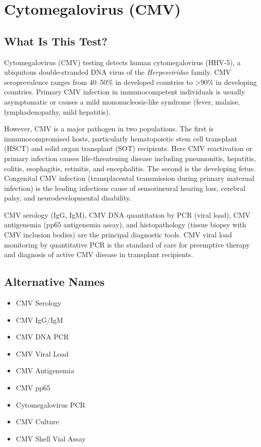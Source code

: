 \chapter{Cytomegalovirus (CMV)}

\section*{What Is This Test?}
Cytomegalovirus (CMV) testing detects human cytomegalovirus (HHV-5), a ubiquitous double-stranded DNA virus of the \textit{Herpesviridae} family. CMV seroprevalence ranges from 40--50\% in developed countries to >90\% in developing countries. Primary CMV infection in immunocompetent individuals is usually asymptomatic or causes a mild mononucleosis-like syndrome (fever, malaise, lymphadenopathy, mild hepatitis).

However, CMV is a major pathogen in two populations. The first is immunocompromised hosts, particularly hematopoietic stem cell transplant (HSCT) and solid organ transplant (SOT) recipients. Here CMV reactivation or primary infection causes life-threatening disease including pneumonitis, hepatitis, colitis, esophagitis, retinitis, and encephalitis. The second is the developing fetus. Congenital CMV infection (transplacental transmission during primary maternal infection) is the leading infectious cause of sensorineural hearing loss, cerebral palsy, and neurodevelopmental disability.

CMV serology (IgG, IgM), CMV DNA quantitation by PCR (viral load), CMV antigenemia (pp65 antigenemia assay), and histopathology (tissue biopsy with CMV inclusion bodies) are the principal diagnostic tools. CMV viral load monitoring by quantitative PCR is the standard of care for preemptive therapy and diagnosis of active CMV disease in transplant recipients.

\section*{Alternative Names}
\begin{itemize}
  \item CMV Serology
  \item CMV IgG/IgM
  \item CMV DNA PCR
  \item CMV Viral Load
  \item CMV Antigenemia
  \item CMV pp65
  \item Cytomegalovirus PCR
  \item CMV Culture
  \item CMV Shell Vial Assay
\end{itemize}
